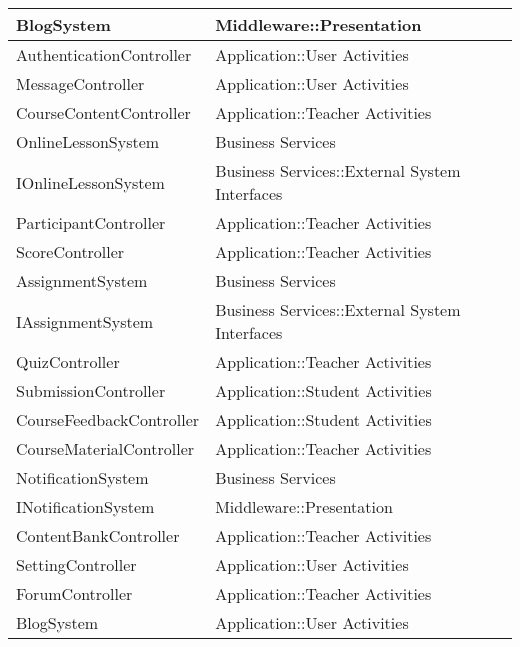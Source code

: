 \documentclass[./../main_file.tex]{subfiles}
\begin{document}
\begin{longtable}{|p{.5\linewidth}|p{.5\linewidth}|}
		BlogSystem               & Middleware::Presentation                      \\ \hline
		AuthenticationController & Application::User Activities                  \\ \hline
		MessageController        & Application::User Activities                  \\ \hline
		CourseContentController  & Application::Teacher Activities               \\ \hline
		OnlineLessonSystem       & Business Services                             \\ \hline
		IOnlineLessonSystem      & Business Services::External System Interfaces \\ \hline
		ParticipantController    & Application::Teacher Activities               \\ \hline
		ScoreController          & Application::Teacher Activities               \\ \hline
		AssignmentSystem         & Business Services                             \\ \hline
		IAssignmentSystem        & Business Services::External System Interfaces \\ \hline
		QuizController           & Application::Teacher Activities               \\ \hline
		SubmissionController     & Application::Student Activities               \\ \hline
		CourseFeedbackController & Application::Student Activities               \\ \hline
		CourseMaterialController & Application::Teacher Activities               \\ \hline
		NotificationSystem       & Business Services                             \\ \hline
		INotificationSystem      & Middleware::Presentation                      \\ \hline
		ContentBankController                                                                                          & Application::Teacher Activities \\ \hline
		SettingController        & Application::User Activities                  \\ \hline
		ForumController                                                                                                & Application::Teacher Activities \\ \hline
		BlogSystem               & Application::User Activities                  \\ \hline

\end{longtable}
\end{document}
